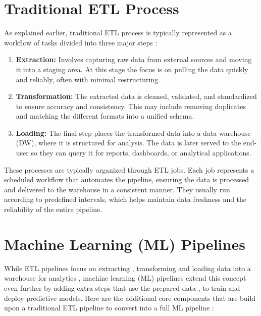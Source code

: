 \section{Traditional ETL Process}
\label{sec:background:etl}
As explained earlier, traditional ETL process is typically represented as a workflow of tasks divided into three major steps \cite{kimball:2004}:

\begin{enumerate}
  \item \textbf{Extraction:} Involves capturing raw data from external sources and moving it into a staging area. At this stage the focus is on pulling the data quickly and reliably, often with minimal restructuring.
  \item \textbf{Transformation:} The extracted data is cleaned, validated, and standardized to ensure accuracy and consistency. This may include removing duplicates and matching the different formats into a unified schema.
  \item \textbf{Loading:} The final step places the transformed data into a data warehouse (DW), where it is structured for analysis. The data is later served to the end-user so they can query it for reports, dashboards, or analytical applications.
\end{enumerate}

These processes are typically organized through ETL jobs. Each job represents a scheduled workflow that automates the pipeline, ensuring the data is processed and delivered to the warehouse in a consistent manner. They usually run according to predefined intervals, which helps maintain data freshness and the reliability of the entire pipeline.





\section{Machine Learning (ML) Pipelines}
\label{sec:background:ml_pipelines}
While ETL pipelines focus on extracting , transforming and loading data into a warehouse for analytics , machine learning (ML) pipelines extend this concept even further by adding extra steps that use the prepared data , to train and deploy predictive models.\cite{lakkarasu:2023} Here are the additional core components that are build upon a traditional ETL pipeline to convert into a full ML pipeline \cite{kramer:2025}:

